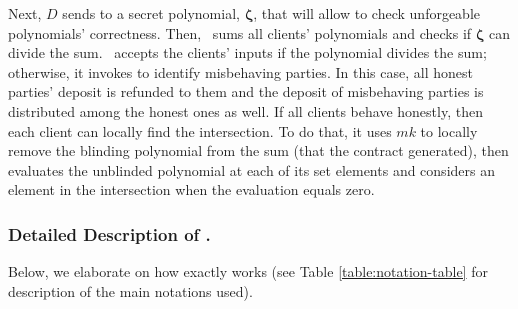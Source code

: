 Next, $D$ sends to \scf a secret polynomial, $\bm\zeta$, that will allow \scf to check unforgeable polynomials' correctness. Then, \scf\ sums all clients' polynomials and checks if $\bm\zeta$ can divide the sum. \scf\ accepts the clients' inputs if the polynomial divides the sum; otherwise, it invokes \aud to identify misbehaving parties.  In this case, all honest parties' deposit is refunded to them and the deposit of misbehaving parties is distributed among the honest ones as well. If all clients behave honestly,  then each client can locally find the intersection. To do that, it uses $mk$ to locally remove the blinding polynomial from the sum (that the contract generated), then evaluates the unblinded polynomial at each of its set elements and considers an element in the intersection when the evaluation equals zero. 


\subsubsection{Detailed Description of \fpsi.} Below, we elaborate on how \fpsi exactly works (see Table \ref{table:notation-table} for description of the main notations used). 

